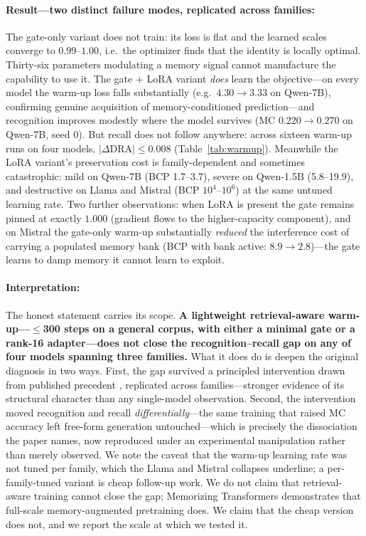 \paragraph{Result---two distinct failure modes, replicated across families:} The gate-only variant does not train: its loss is flat and the learned scales converge to $0.99$--$1.00$, i.e.\ the optimizer finds that the identity is locally optimal. Thirty-six parameters modulating a memory signal cannot manufacture the capability to use it. The gate + LoRA variant \emph{does} learn the objective---on every model the warm-up loss falls substantially (e.g.\ $4.30 \to 3.33$ on Qwen-7B), confirming genuine acquisition of memory-conditioned prediction---and recognition improves modestly where the model survives (MC $0.220 \to 0.270$ on Qwen-7B, seed 0). But recall does not follow anywhere: across sixteen warm-up runs on four models, $|\Delta\mathrm{DRA}| \leq 0.008$ (Table~\ref{tab:warmup}). Meanwhile the LoRA variant's preservation cost is family-dependent and sometimes catastrophic: mild on Qwen-7B (BCP 1.7--3.7), severe on Qwen-1.5B (5.8--19.9), and destructive on Llama and Mistral (BCP $10^{4}$--$10^{6}$) at the same untuned learning rate. Two further observations: when LoRA is present the gate remains pinned at exactly $1.000$ (gradient flows to the higher-capacity component), and on Mistral the gate-only warm-up substantially \emph{reduced} the interference cost of carrying a populated memory bank (BCP with bank active: $8.9 \to 2.8$)---the gate learns to damp memory it cannot learn to exploit.

\paragraph{Interpretation:} The honest statement carries its scope. \textbf{A lightweight retrieval-aware warm-up---$\leq$300 steps on a general corpus, with either a minimal gate or a rank-16 adapter---does not close the recognition--recall gap on any of four models spanning three families.} What it does do is deepen the original diagnosis in two ways. First, the gap survived a principled intervention drawn from published precedent \citep{wu2022memorizing,gmemllm2026,wang2024memoryllm}, replicated across families---stronger evidence of its structural character than any single-model observation. Second, the intervention moved recognition and recall \emph{differentially}---the same training that raised MC accuracy left free-form generation untouched---which is precisely the dissociation the paper names, now reproduced under an experimental manipulation rather than merely observed. We note the caveat that the warm-up learning rate was not tuned per family, which the Llama and Mistral collapses underline; a per-family-tuned variant is cheap follow-up work. We do not claim that retrieval-aware training cannot close the gap; Memorizing Transformers demonstrates that full-scale memory-augmented pretraining does. We claim that the cheap version does not, and we report the scale at which we tested it.

